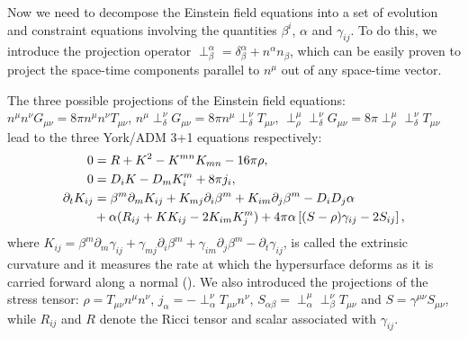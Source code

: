 Now we need to decompose the Einstein field equations into a set of evolution and constraint equations involving the quantities $\beta^i$, $\alpha$ and $\gamma_{ij}$. To do this, we introduce the projection operator $\perp^{\alpha}_{\beta} = \delta^{\alpha}_{\beta} + n^{\alpha} n_{\beta}$, which can be easily proven to project the space-time components parallel to $n^{\mu}$ out of any space-time vector.

The three possible projections of the Einstein field equations: $n^{\mu} n^{\nu} G_{\mu\nu} = 8\pi n^{\mu} n^{\nu} T_{\mu\nu}$, $n^{\mu}\perp^{\nu}_{\delta}G_{\mu\nu} = 8\pi n^{\mu} \perp^{\nu}_{\delta} T_{\mu\nu}$, $\perp^{\mu}_{\rho} \perp^{\nu}_{\delta} G_{\mu\nu} = 8\pi \perp^{\mu}_{\rho} \perp^{\nu}_{\delta} T_{\mu\nu}$ lead to the three York/ADM 3+1 equations respectively:
%
\begin{align}
0 &= R + K^{2} - K^{mn}K_{mn} -16\pi\rho,\label{eq:3p1_a} \\
0 &= D_iK - D_mK^m_i + 8\pi j_i,\label{eq:3p1_b} \\
\partial_t K_{ij} &= \beta^m\partial_mK_{ij} + K_{mj}\partial_i\beta^m + K_{im}\partial_j\beta^m - D_iD_j\alpha \label{eq:3p1_c}\\ 
&+ \alpha(R_{ij}+KK_{ij}-2K_{im}K^m_{j})+4\pi\alpha\left[(S-\rho)\gamma_{ij}-2S_{ij}\right]\notag,
\end{align}
where $K_{ij} = \beta^m\partial_m\gamma_{ij} + \gamma_{mj}\partial_{i}\beta^{m} + \gamma_{im}\partial_j\beta^{m}-\partial_{t}\gamma_{ij}$, is called the extrinsic curvature and it measures
the rate at which the hypersurface deforms as it is carried forward along a normal (\citet*{baumgarte2010numerical}). We also introduced the projections of the stress tensor: $\rho = T_{\mu\nu} n^{\mu} n^{\nu}$, $j_{\alpha}= -\perp^{\nu}_{\alpha} T_{\mu\nu} n^{\nu}$, $S_{\alpha\beta} = \perp^{\mu}_{\alpha} \perp^{\nu}_{\beta} T_{\mu\nu}$ and $S=\gamma^{\mu\nu} S_{\mu\nu}$, while $R_{ij}$ and $R$ denote the Ricci tensor and scalar associated with $\gamma_{ij}$.


